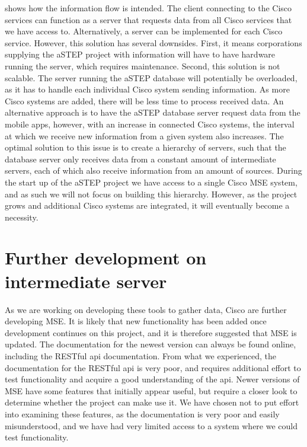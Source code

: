  shows how the information flow is intended. The client connecting to the Cisco services can function as a server that requests data from all Cisco services that we have access to. Alternatively, a server can be implemented for each Cisco service. However, this solution has several downsides. First, it means corporations supplying the aSTEP project with information will have to have hardware running the server, which requires maintenance. Second, this solution is not scalable. The server running the aSTEP database will potentially be overloaded, as it has to handle each individual Cisco system sending information. As more Cisco systems are added, there will be less time to process received data. An alternative approach is to have the aSTEP database server request data from the mobile apps, however, with an increase in connected Cisco systems, the interval at which we receive new information from a given system also increases. The optimal solution to this issue is to create a hierarchy of servers, such that the database server only receives data from a constant amount of intermediate servers, each of which also receive information from an amount of sources. During the start up of the aSTEP project we have access to a single Cisco MSE system, and as such we will not focus on building this hierarchy. However, as the project grows and additional Cisco systems are integrated, it will eventually become a necessity.

\section{Further development on intermediate server}\label{sec:future_intermediate}
As we are working on developing these tools to gather data, Cisco are further developing MSE. It is likely that new functionality has been added once development continues on this project, and it is therefore suggested that MSE is updated. The documentation for the newest version can always be found online, including the RESTful api documentation. From what we experienced, the documentation for the RESTful api is very poor, and requires additional effort to test functionality and acquire a good understanding of the api. Newer versions of MSE have some features that initially appear useful, but require a closer look to determine whether the project can make use it. We have chosen not to put effort into examining these features, as the documentation is very poor and easily misunderstood, and we have had very limited access to a system where we could test functionality.

